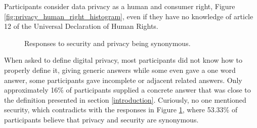 Participants consider data privacy as a human and consumer right, Figure \ref*{fig:privacy_human_right_histogram},
even if they have no knowledge of article 12 of the Universal Declaration of Human Rights.

\begin{figure}
    \centering
    \caption{Responses to security and privacy being synonymous.}
    \label{fig:security_equals_privacy}
\end{figure}

When asked to define digital privacy, most participants did not know
how to properly define it, giving generic answers while some even gave a one word answer,
some participants gave incomplete or adjacent related answers. Only approximately
16\% of participants supplied a concrete answer that was close to the definition
presented in section \ref{introduction}. Curiously, no one mentioned security,
which contradicts with the responses in Figure \ref*{fig:security_equals_privacy},
where 53.33\% of participants believe that privacy and security are synonymous.

